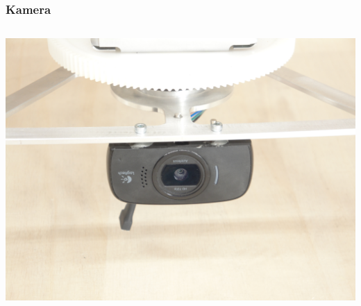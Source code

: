 \begin{frame}
    \frametitle{Kamera}
    \begin{columns}
        \begin{column}{0.9\textwidth}
            \centering
            \includegraphics[width=1.0\textwidth]{../doc/fig/DSC02993.JPG}
        \end{column}
    \end{columns}
\end{frame}
